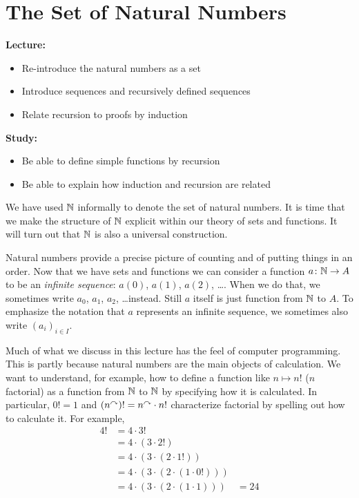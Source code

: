 \chapter{The Set of Natural Numbers}\label{lec:natural-numbers}

\begin{goals}
\noindent\textbf{Lecture:}
\begin{itemize}
	\item Re-introduce the natural numbers as a set
	\item Introduce sequences and recursively defined sequences
	\item Relate recursion to proofs by induction
\end{itemize}

\noindent\textbf{Study:}
\begin{itemize}
	\item Be able to define simple functions by recursion
	\item Be able to explain how induction and recursion are related
\end{itemize}
\end{goals}

We have used $\mathbb N$ informally to denote the set of natural numbers. 
It is time that we make the structure of $\mathbb N$ explicit within our theory of sets and functions. 
It will turn out that $\mathbb N$ is also a universal construction. 

Natural numbers provide a precise picture of counting and of putting things in an order.
Now that we have sets and functions we can consider a function ${a}\colon{\mathbb N}\to{A}$ to be an \emph{infinite sequence}: $a(0)$, $a(1)$, $a(2)$, \ldots.
When we do that, we sometimes write $a_0$, $a_1$, $a_2$, \ldots instead.
Still $a$ itself is just function from $\mathbb N$ to $A$.
To emphasize the notation that $a$ represents an infinite sequence, we sometimes also write $(a_i)_{i\in I}$.

Much of what we discuss in this lecture has the feel of computer programming.
This is partly because natural numbers are the main objects of calculation.
We want to understand, for example, how to define a function like $n\mapsto n!$ ($n$ factorial) as a function from $\mathbb N$ to $\mathbb N$ by specifying how it is calculated.
In particular, $0! = 1$ and $(n^\curvearrowright)! = n^\curvearrowright\cdot n!$ characterize factorial by spelling out how to calculate it.
For example,
\begin{align*}
	4!  &= 4 \cdot 3! \\
		&= 4 \cdot (3 \cdot 2!)\\
		&= 4 \cdot (3 \cdot (2 \cdot 1!))\\
		&= 4 \cdot (3 \cdot (2 \cdot (1 \cdot 0!)))\\
		&= 4 \cdot (3 \cdot (2 \cdot (1 \cdot 1)))
		&= 24
\end{align*}

